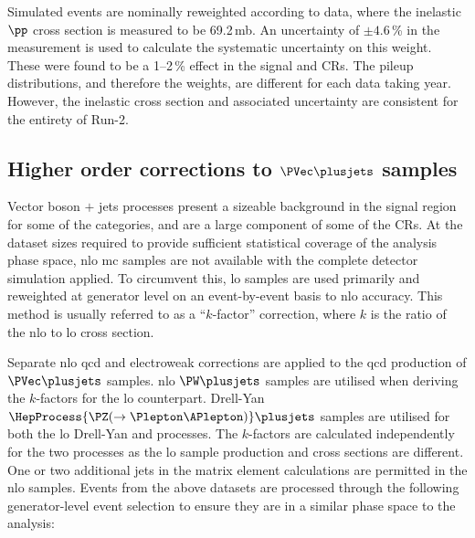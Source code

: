 Simulated events are nominally reweighted according to data, where the inelastic $\pp$ cross section is measured to be 69.2\,mb. An uncertainty of $\pm \text{4.6}$\,\% in the measurement is used to calculate the systematic uncertainty on this weight. These were found to be a 1--2\,\% effect in the signal and \glspl{CR}. The pileup distributions, and therefore the weights, are different for each data taking year. However, the inelastic cross section and associated uncertainty are consistent for the entirety of Run-2.





\subsection{Higher order corrections to \texorpdfstring{$\PVec \plusjets$}{V plus jets} samples}
\label{subsec:htoinv_nlo_corrs}

Vector boson $+$ \glspl{jet} processes present a sizeable background in the signal region for some of the categories, and are a large component of some of the \glspl{CR}. At the dataset sizes required to provide sufficient statistical coverage of the analysis phase space, \acrshort{nlo} \acrshort{mc} samples are not available with the complete detector simulation applied. To circumvent this, \acrshort{lo} samples are used primarily and reweighted at generator level on an event-by-event basis to \acrshort{nlo} accuracy. This method is usually referred to as a ``$k$-factor'' correction, where $k$ is the ratio of the \acrshort{nlo} to \acrshort{lo} cross section.

Separate \acrshort{nlo} \acrshort{qcd} and electroweak corrections are applied to the \acrshort{qcd} production of $\PVec \plusjets$ samples. \acrshort{nlo} $\PW \plusjets$ samples are utilised when deriving the $k$-factors for the \acrshort{lo} counterpart. Drell-Yan $\HepProcess{\PZ (\to \Plepton\APlepton)} \plusjets$ samples are utilised for both the \acrshort{lo} Drell-Yan and \ztonunupjets processes. The $k$-factors are calculated independently for the two processes as the \acrshort{lo} sample production and cross sections are different. One or two additional \glspl{jet} in the matrix element calculations are permitted in the \acrshort{nlo} samples. Events from the above datasets are processed through the following generator-level event selection to ensure they are in a similar phase space to the analysis:

